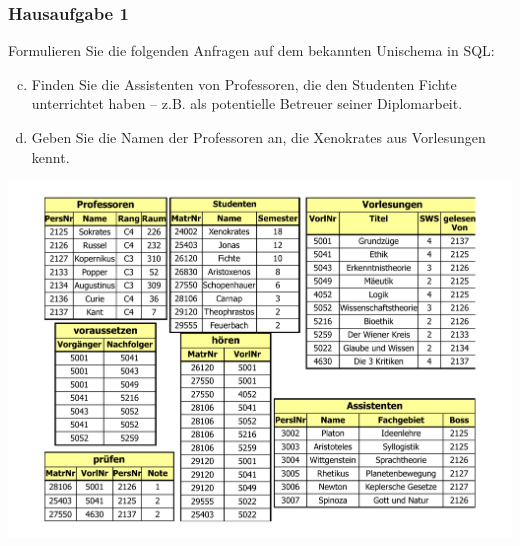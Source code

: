 \begin{frame}[fragile]
	\frametitle{Hausaufgabe 1}
	\vspace{0.5cm}

	\begin{multicols}{2}
		Formulieren Sie die folgenden Anfragen auf dem bekannten Unischema in SQL:
		\begin{enumerate}[a)]
			\setcounter{enumi}{2}
			\item Finden Sie die Assistenten von Professoren, die den Studenten Fichte unterrichtet haben – z.B. als potentielle Betreuer seiner Diplomarbeit.
			\item Geben Sie die Namen der Professoren an, die Xenokrates aus Vorlesungen kennt.
		\end{enumerate}
		\vfill\columnbreak

		\begin{center}
			\includegraphics[height=.6\paperheight]{../img/uni.pdf}
		\end{center}
	\end{multicols}
\end{frame}


